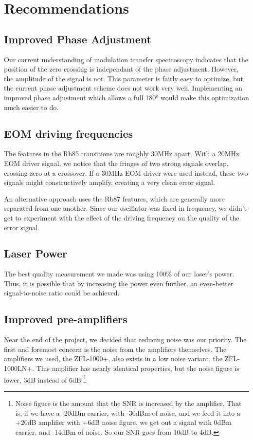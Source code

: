 \newpage

\section{Recommendations}

\subsection{Improved Phase Adjustment}

Our current understanding of modulation transfer spectroscopy indicates that the position of the zero crossing is independant of the phase adjustment.  However, the amplitude of the signal is not.  This parameter is fairly easy to optimize, but the current phase adjustment scheme does not work very well.  Implementing an improved phase adjustment which allows a full 180° would make this optimization much easier to do.

\subsection{EOM driving frequencies}

The features in the Rb85 transitions are roughly 30MHz apart.  With a 20MHz EOM driver signal, we notice that the fringes of two strong signals overlap, crossing zero at a crossover.  If a 30MHz EOM driver were used instead, these two signals might constructively amplify, creating a very clean error signal.

An alternative approach uses the Rb87 features, which are generally more separated from one another.  Since our oscillator was fixed in frequency, we didn't get to experiment with the effect of the driving frequency on the quality of the error signal.

\subsection{Laser Power}

The best quality measurement we made was using 100\% of our laser's power.  Thus, it is possible that by increasing the power even further, an even-better signal-to-noise ratio could be achieved.

\subsection{Improved pre-amplifiers}

Near the end of the project, we decided that reducing noise was our priority.  The first and foremost concern is the noise from the amplifiers themselves.  The amplifiers we used, the ZFL-1000+, also exists in a low noise variant, the ZFL-1000LN+.  This amplifier has nearly identical properties, but the noise figure is lower, 3dB instead of 6dB \footnote{Noise figure is the amount that the SNR is increased by the amplifier.  That is, if we have a -20dBm carrier, with -30dBm of noise, and we feed it into a +20dB amplifier with +6dB noise figure, we get out a signal with 0dBm carrier, and -14dBm of noise.  So our SNR goes from 10dB to 4dB.}

